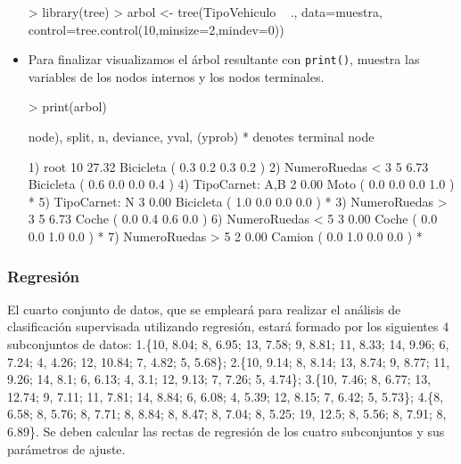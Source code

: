 \documentclass[a4paper, 12pt]{article}
\begin{document}
\begin{itemize}
\begin{Schunk}
\begin{Sinput}
> library(tree)
> arbol <- tree(TipoVehiculo ~ ., data=muestra, control=tree.control(10,minsize=2,mindev=0))
\end{Sinput}
\end{Schunk}
		\item Para finalizar visualizamos el árbol resultante con \texttt{print()}, muestra las variables de los nodos internos y  los nodos terminales.
\begin{Schunk}
\begin{Sinput}
> print(arbol)
\end{Sinput}
\begin{Soutput}
node), split, n, deviance, yval, (yprob)
      * denotes terminal node

1) root 10 27.32 Bicicleta ( 0.3 0.2 0.3 0.2 )  
  2) NumeroRuedas < 3 5  6.73 Bicicleta ( 0.6 0.0 0.0 0.4 )  
    4) TipoCarnet: A,B 2  0.00 Moto ( 0.0 0.0 0.0 1.0 ) *
    5) TipoCarnet: N 3  0.00 Bicicleta ( 1.0 0.0 0.0 0.0 ) *
  3) NumeroRuedas > 3 5  6.73 Coche ( 0.0 0.4 0.6 0.0 )  
    6) NumeroRuedas < 5 3  0.00 Coche ( 0.0 0.0 1.0 0.0 ) *
    7) NumeroRuedas > 5 2  0.00 Camion ( 0.0 1.0 0.0 0.0 ) *
\end{Soutput}
\end{Schunk}
		\end{itemize}
	
	\subsubsection{Regresión}
	
	El cuarto conjunto de datos, que se empleará para realizar el análisis de clasificación supervisada utilizando regresión, estará formado por los siguientes 4 subconjuntos de datos: 1.\{10, 8.04; 8, 6.95; 13, 7.58; 9, 8.81; 11, 8.33; 14, 9.96; 6, 7.24; 4, 4.26; 12, 10.84; 7, 4.82; 5, 5.68\}; 2.\{10, 9.14; 8, 8.14; 13, 8.74; 9, 8.77; 11, 9.26; 14, 8.1; 6, 6.13; 4, 3.1; 12, 9.13; 7, 7.26; 5, 4.74\}; 3.\{10, 7.46; 8, 6.77; 13, 12.74; 9, 7.11; 11, 7.81; 14, 8.84; 6, 6.08; 4, 5.39; 12, 8.15; 7, 6.42; 5, 5.73\}; 4.\{8, 6.58; 8, 5.76; 8, 7.71; 8, 8.84; 8, 8.47; 8, 7.04; 8, 5.25; 19, 12.5; 8, 5.56; 8, 7.91; 8, 6.89\}. Se deben calcular las rectas de regresión de los cuatro subconjuntos y sus parámetros de ajuste.
		
\end{document}
